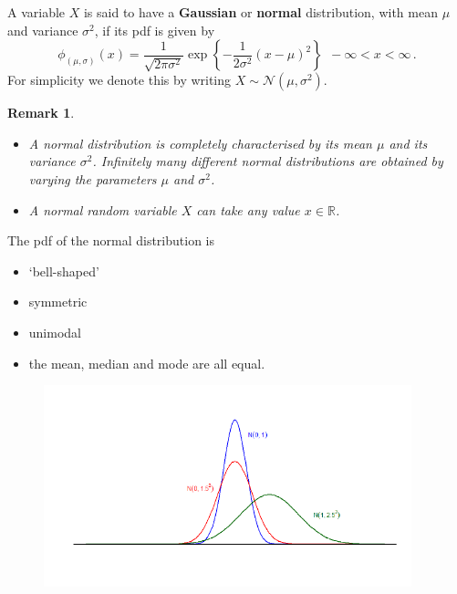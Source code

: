 \documentclass[notes=show,smaller]{beamer}\usepackage[]{graphicx}\usepackage[]{color}
\newtheorem{remark}{Remark}[section]
\newcommand{\N}{\mathcal{N}}
\newenvironment{stepitemize}{\begin{itemize}[<+->]}{\end{itemize} }
\begin{document}
\begin{frame}{\subsecname}

  \begin{definition}
  A variable $X$ is said to have a \textbf{Gaussian} or \textbf{normal}
  distribution, with mean $\mu $ and variance $\sigma ^{2}$, if its pdf is given by
  \begin{equation*}
  \phi_{(\mu,\sigma)}(x) =\frac{1}{\sqrt{2\pi \sigma ^{2}}}\exp{ \left\{ -\frac{1%
  }{2\sigma ^{2}}\left( x-\mu \right) ^{2}\right\}}~~-\infty<x<\infty\,.
  \end{equation*}
  For simplicity we denote this by writing $X\sim \N\left( \mu ,\sigma ^{2}\right) $.
  \end{definition}
  \pause
  \begin{remark}
  \begin{itemize}
  \item A normal distribution is completely characterised by its mean $\mu $ and its variance $\sigma ^{2}$. Infinitely many different normal distributions are obtained by varying the parameters $\mu $ and $\sigma ^{2}$.
  \item A normal random variable $X$ can take any value $x\in\mathbb{R}$.
  \end{itemize}
  \end{remark}
\end{frame}

\begin{frame}{\subsecname}
  The pdf of the normal distribution is
  \begin{stepitemize}
  \item `bell-shaped'
  \item symmetric
  \item unimodal
  \item the mean, median and mode are all equal.
  \end{stepitemize}
  \begin{figure}[ptb]\centering
  \includegraphics[width=0.95\textwidth,height=0.75\textheight]{img/normals4.pdf}%
  \end{figure}
\end{frame}
\end{document}
